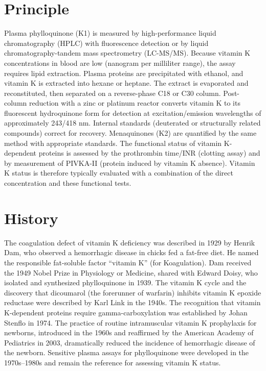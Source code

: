 \section*{Principle}
Plasma phylloquinone (K1) is measured by high-performance liquid chromatography (HPLC) with fluorescence detection or by liquid chromatography-tandem mass spectrometry (LC-MS/MS). Because vitamin K concentrations in blood are low (nanogram per milliliter range), the assay requires lipid extraction. Plasma proteins are precipitated with ethanol, and vitamin K is extracted into hexane or heptane. The extract is evaporated and reconstituted, then separated on a reverse-phase C18 or C30 column. Post-column reduction with a zinc or platinum reactor converts vitamin K to its fluorescent hydroquinone form for detection at excitation/emission wavelengths of approximately 243/418 nm. Internal standards (deuterated or structurally related compounds) correct for recovery. Menaquinones (K2) are quantified by the same method with appropriate standards. The functional status of vitamin K-dependent proteins is assessed by the prothrombin time/INR (clotting assay) and by measurement of PIVKA-II (protein induced by vitamin K absence). Vitamin K status is therefore typically evaluated with a combination of the direct concentration and these functional tests.

\section*{History}
The coagulation defect of vitamin K deficiency was described in 1929 by Henrik Dam, who observed a hemorrhagic disease in chicks fed a fat-free diet. He named the responsible fat-soluble factor ``vitamin K'' (for Koagulation). Dam received the 1949 Nobel Prize in Physiology or Medicine, shared with Edward Doisy, who isolated and synthesized phylloquinone in 1939. The vitamin K cycle and the discovery that dicoumarol (the forerunner of warfarin) inhibits vitamin K epoxide reductase were described by Karl Link in the 1940s. The recognition that vitamin K-dependent proteins require gamma-carboxylation was established by Johan Stenflo in 1974. The practice of routine intramuscular vitamin K prophylaxis for newborns, introduced in the 1960s and reaffirmed by the American Academy of Pediatrics in 2003, dramatically reduced the incidence of hemorrhagic disease of the newborn. Sensitive plasma assays for phylloquinone were developed in the 1970s--1980s and remain the reference for assessing vitamin K status.

